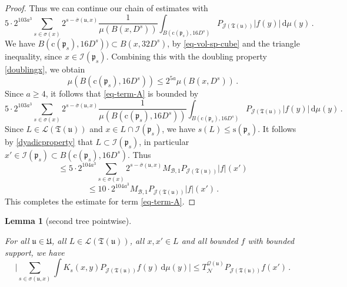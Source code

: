 \documentclass[10pt,a4paper]{article}
\theoremstyle{plain}
\newtheorem{lemma}[theorem]{Lemma}
\theoremstyle{definition}
\numberwithin{equation}{subsection}
\newcommand{\fp}{{\mathfrak p}}
\newcommand{\fu}{{\mathfrak u}}
\newcommand{\fU}{{\mathfrak U}}
\newcommand{\fT}{{\mathfrak T}}
\newcommand{\pc}{{\mathrm{c}}}
\newcommand{\ps}{{\mathrm{s}}}
\newcommand{\scI}{{\mathcal{I}}} %
\newcommand{\fcc}{{\mathcal{Q}}}
\newcommand{\lean}[1]{}
\newcommand{\leanok}{}
\begin{document}
\begin{proof}
    Thus we can continue our chain of estimates with
    $$
        5\cdot 2^{103a^3} \sum_{s\in\sigma(x)}2^{s - \overline{\sigma}(\fu, x)} \frac{1}{\mu(B(x,D^s))}\int_{B(\pc(\fp_s),16 D^s)}P_{\mathcal{J}(\fT(\fu))}|f(y)|\,\mathrm{d}\mu(y)\,.
    $$
    We have $B(\pc(\fp_s), 16D^s)) \subset B(x, 32D^s)$, by \eqref{eq-vol-sp-cube} and the triangle inequality, since $x \in \scI(\fp_s)$. Combining this with the doubling property \eqref{doublingx}, we obtain
    $$
        \mu(B(\pc(\fp_s), 16D^s)) \le 2^{5a} \mu(B(x, D^s))\,.
    $$
    Since $a \ge 4$, it follows that \eqref{eq-term-A} is bounded by
    $$
        5\cdot 2^{103a^3} \sum_{s\in\sigma(x)}2^{s - \overline{\sigma}(\fu, x)} \frac{1}{\mu(B(\pc(\fp_s),16D^s))}\int_{B(\pc(\fp_s),16D^s)}P_{\mathcal{J}(\fT(\fu))}|f(y)|\,\mathrm{d}\mu(y)\,.
    $$
    Since $L \in \mathcal{L}(\fT(\fu))$ and $x\in L \cap \scI(\fp_s)$, we have $s(L) \le \ps(\fp_s)$. It follows by \eqref{dyadicproperty} that $L \subset \scI(\fp_s)$, in particular $x' \in \scI(\fp_s) \subset B(\pc(\fp_s), 16D^s)$. Thus
    $$
        \le 5\cdot 2^{104a^3} \sum_{s\in\sigma(x)}2^{s - \overline{\sigma}(\fu, x)} M_{\mathcal{B}, 1}P_{\mathcal{J}(\fT(\fu))}|f|(x')
    $$
    $$
        \le 10\cdot 2^{104a^3} M_{\mathcal{B}, 1}P_{\mathcal{J}(\fT(\fu))}|f|(x')\,.
    $$
    This completes the estimate for term \eqref{eq-term-A}.
\end{proof}

\begin{lemma}[second tree pointwise]
    \label{second-tree-pointwise}
    \leanok
    \lean{TileStructure.Forest.second_tree_pointwise}
    For all $\fu \in \fU$, all $L \in \mathcal{L}(\fT(\fu))$, all $x, x' \in L$ and all bounded $f$ with bounded support, we have
    $$
         \Bigg| \sum_{s \in \sigma(\fu, x)} \int K_s(x,y) P_{\mathcal{J}(\fT(\fu))} f(y) \, \mathrm{d}\mu(y) \Bigg| \le T_{\mathcal{N}}^{\fcc(\fu)} P_{\mathcal{J}(\fT(\fu))} f(x')\,.
    $$
\end{lemma}
\end{document}
